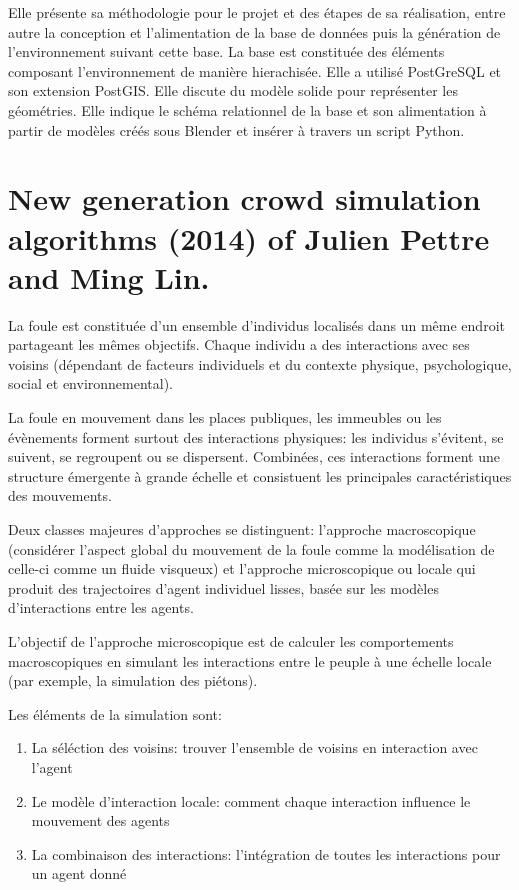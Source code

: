 \documentclass[11pt]{article}
\begin{document}
Elle présente sa méthodologie pour le projet et des étapes de sa réalisation, entre autre la conception et l'alimentation de la base de données puis la génération de l'environnement suivant cette base. La base est constituée des éléments composant l'environnement de manière hierachisée. Elle a utilisé PostGreSQL et son extension PostGIS. Elle discute du modèle solide pour représenter les géométries. Elle indique le schéma relationnel de la base et son alimentation à partir de modèles créés sous Blender et insérer à travers un script Python.

\section*{New generation crowd simulation algorithms (2014) of Julien Pettre and Ming Lin.}

La foule est constituée d'un ensemble d'individus localisés dans un même endroit partageant les mêmes objectifs. Chaque individu a des interactions avec ses voisins (dépendant de facteurs individuels et du contexte physique, psychologique, social et environnemental).

La foule en mouvement dans les places publiques, les immeubles ou les évènements forment surtout des interactions physiques: les individus s'évitent, se suivent, se regroupent ou se dispersent. Combinées, ces interactions forment une structure émergente à grande échelle et consistuent les principales caractéristiques des mouvements.

Deux classes majeures d'approches se distinguent: l'approche macroscopique (considérer l'aspect global du mouvement de la foule comme la modélisation de celle-ci comme un fluide visqueux) et l'approche microscopique ou locale qui produit des trajectoires d'agent individuel lisses, basée sur les modèles d'interactions entre les agents.

L'objectif de l'approche microscopique est de calculer les comportements macroscopiques en simulant les interactions entre le peuple à une échelle locale (par exemple, la simulation des piétons).

Les éléments de la simulation sont:
\begin{enumerate}
\item La séléction des voisins: trouver l'ensemble de voisins en interaction avec l'agent
\item Le modèle d'interaction locale: comment chaque interaction influence le mouvement des agents
\item La combinaison des interactions: l'intégration de toutes les interactions pour un agent donné
\end{enumerate}
\end{document}
